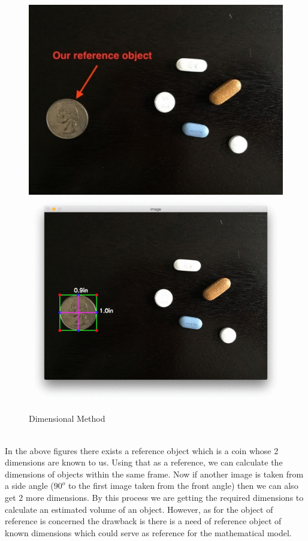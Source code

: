 \begin{figure}[!hb]
   \centering
   \includegraphics[scale=0.8]{images/q1.png}
   \includegraphics[scale=0.3]{images/q2.png}
   
   \caption{Dimensional Method}\label{fig:picture}
\end{figure}
\\
In the above figures there exists a reference object which is a coin whose 2 dimensions are known to us. Using that as a reference, we can calculate the dimensions of objects within the same frame. Now if another image is taken from a side angle ($90^{o}$ to the first image taken from the front angle) then we can also get 2 more dimensions. By this process we are getting the required dimensions to calculate an estimated volume of an object. However, as for the object of reference is concerned the drawback is there is a need of  reference object of known dimensions which could serve as reference for the mathematical model.
